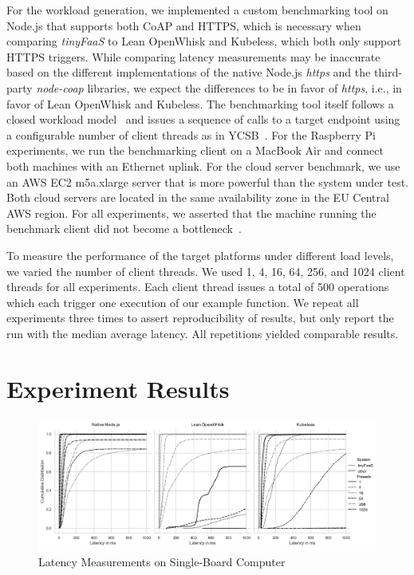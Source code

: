 For the workload generation, we implemented a custom benchmarking tool on Node.js that supports both CoAP and HTTPS, which is necessary when comparing \textit{tinyFaaS} to Lean OpenWhisk and Kubeless, which both only support HTTPS triggers.
While comparing latency measurements may be inaccurate based on the different implementations of the native Node.js \textit{https} and the third-party \textit{node-coap} libraries, we expect the differences to be in favor of \textit{https}, i.e., in favor of Lean OpenWhisk and Kubeless.
The benchmarking tool itself follows a closed workload model~\cite{paper_schroeder_open_closed_workloads,book_bermbach_cloud_service_benchmarking} and issues a sequence of calls to a target endpoint using a configurable number of client threads as in YCSB~\cite{paper_cooper_ycsb}.
For the Raspberry Pi experiments, we run the benchmarking client on a MacBook Air and connect both machines with an Ethernet uplink.
For the cloud server benchmark, we use an AWS EC2 m5a.xlarge server that is more powerful than the system under test.
Both cloud servers are located in the same availability zone in the EU Central AWS region.
For all experiments, we asserted that the machine running the benchmark client did not become a bottleneck~\cite{book_bermbach_cloud_service_benchmarking}.

To measure the performance of the target platforms under different load levels, we varied the number of client threads.
We used 1, 4, 16, 64, 256, and 1024 client threads for all experiments.
Each client thread issues a total of 500 operations which each trigger one execution of our example function.
We repeat all experiments three times to assert reproducibility of results, but only report the run with the median average latency.
All repetitions yielded comparable results.


\section{Experiment Results}
\label{sec:discussion}

\begin{figure}[ht]
  \centering
  \includegraphics[width=1\columnwidth]{fig/pigraph.pdf}
  \caption{Latency Measurements on Single-Board Computer}
  \label{fig:pigraph}
\end{figure}

